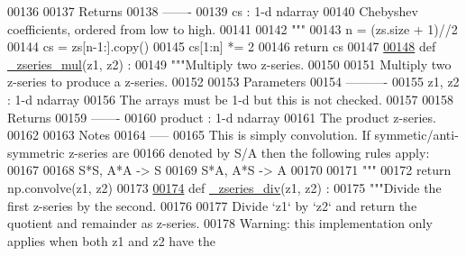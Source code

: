 \begin{DoxyCode}
00136 \textcolor{stringliteral}{}
00137 \textcolor{stringliteral}{    Returns}
00138 \textcolor{stringliteral}{    -------}
00139 \textcolor{stringliteral}{    cs : 1-d ndarray}
00140 \textcolor{stringliteral}{        Chebyshev coefficients, ordered from  low to high.}
00141 \textcolor{stringliteral}{}
00142 \textcolor{stringliteral}{    """}
00143     n = (zs.size + 1)//2
00144     cs = zs[n-1:].copy()
00145     cs[1:n] *= 2
00146     \textcolor{keywordflow}{return} cs
00147 
\hypertarget{chebyshev_8py_source_l00148}{}\hyperlink{namespacepyneb_1_1utils_1_1chebyshev_a46d958933482afac66ea41d143155dae}{00148} \textcolor{keyword}{def }\hyperlink{namespacepyneb_1_1utils_1_1chebyshev_a46d958933482afac66ea41d143155dae}{\_zseries\_mul}(z1, z2) :
00149     \textcolor{stringliteral}{"""Multiply two z-series.}
00150 \textcolor{stringliteral}{}
00151 \textcolor{stringliteral}{    Multiply two z-series to produce a z-series.}
00152 \textcolor{stringliteral}{}
00153 \textcolor{stringliteral}{    Parameters}
00154 \textcolor{stringliteral}{    ----------}
00155 \textcolor{stringliteral}{    z1, z2 : 1-d ndarray}
00156 \textcolor{stringliteral}{        The arrays must be 1-d but this is not checked.}
00157 \textcolor{stringliteral}{}
00158 \textcolor{stringliteral}{    Returns}
00159 \textcolor{stringliteral}{    -------}
00160 \textcolor{stringliteral}{    product : 1-d ndarray}
00161 \textcolor{stringliteral}{        The product z-series.}
00162 \textcolor{stringliteral}{}
00163 \textcolor{stringliteral}{    Notes}
00164 \textcolor{stringliteral}{    -----}
00165 \textcolor{stringliteral}{    This is simply convolution. If symmetic/anti-symmetric z-series are}
00166 \textcolor{stringliteral}{    denoted by S/A then the following rules apply:}
00167 \textcolor{stringliteral}{}
00168 \textcolor{stringliteral}{    S*S, A*A -> S}
00169 \textcolor{stringliteral}{    S*A, A*S -> A}
00170 \textcolor{stringliteral}{}
00171 \textcolor{stringliteral}{    """}
00172     \textcolor{keywordflow}{return} np.convolve(z1, z2)
00173 
\hypertarget{chebyshev_8py_source_l00174}{}\hyperlink{namespacepyneb_1_1utils_1_1chebyshev_ad00f2653194746fa98c3421eb7c26f2c}{00174} \textcolor{keyword}{def }\hyperlink{namespacepyneb_1_1utils_1_1chebyshev_ad00f2653194746fa98c3421eb7c26f2c}{\_zseries\_div}(z1, z2) :
00175     \textcolor{stringliteral}{"""Divide the first z-series by the second.}
00176 \textcolor{stringliteral}{}
00177 \textcolor{stringliteral}{    Divide `z1` by `z2` and return the quotient and remainder as z-series.}
00178 \textcolor{stringliteral}{    Warning: this implementation only applies when both z1 and z2 have the}

\end{DoxyCode}
